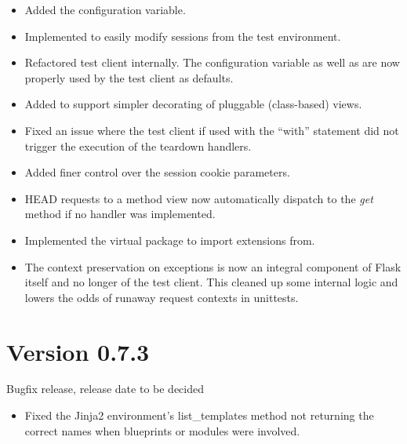 \documentclass[a4paper,12pt]{sphinxmanual}
\begin{document}
\begin{itemize}
\item {} 
Added the  configuration variable.

\item {} 
Implemented  to
easily modify sessions from the test environment.

\item {} 
Refactored test client internally.  The  configuration
variable as well as  are now properly used by the test client
as defaults.

\item {} 
Added {\hyperref[api:flask.views.View.decorators]{}} to support simpler decorating of
pluggable (class-based) views.

\item {} 
Fixed an issue where the test client if used with the ``with'' statement did not
trigger the execution of the teardown handlers.

\item {} 
Added finer control over the session cookie parameters.

\item {} 
HEAD requests to a method view now automatically dispatch to the \emph{get}
method if no handler was implemented.

\item {} 
Implemented the virtual  package to import extensions from.

\item {} 
The context preservation on exceptions is now an integral component of
Flask itself and no longer of the test client.  This cleaned up some
internal logic and lowers the odds of runaway request contexts in unittests.

\end{itemize}


\section{Version 0.7.3}
\label{changelog:version-0-7-3}
Bugfix release, release date to be decided
\begin{itemize}
\item {} 
Fixed the Jinja2 environment's list\_templates method not returning the
correct names when blueprints or modules were involved.

\end{itemize}
\end{document}
